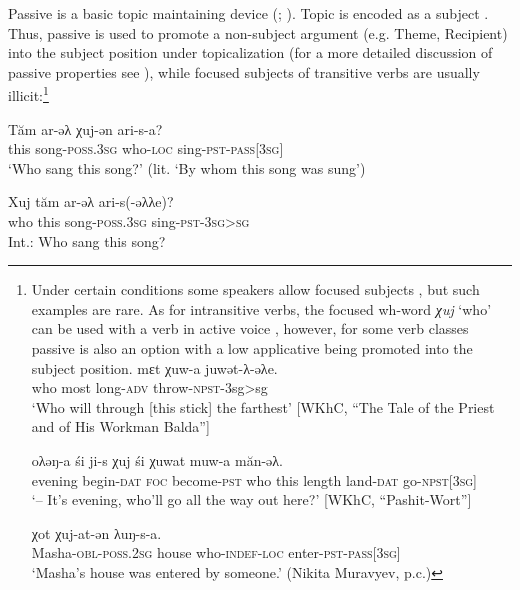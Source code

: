 \documentclass[output=paper]{langscibook}
\begin{document}
Passive is a basic topic maintaining device (\citealt[30]{Nikolaeva1999Ostyak}; \citealt[35]{Koshkaryova2002}). Topic is encoded as a subject \citep{Nikolaeva1995, Nikolaeva1999Ostyak}. Thus, passive is used to promote a non-subject argument (e.g. Theme, Recipient) into the subject position under topicalization (for a more detailed discussion of passive properties see \citealt{Kiss2019, ColleyPrivoznov2019}), while focused subjects of transitive verbs are usually illicit:\footnote{Under certain conditions some speakers allow focused subjects , but such examples are rare. As for intransitive verbs, the focused wh-word \textit{χuj} ‘who’ can be used with a verb in active voice , however, for some verb classes passive is also an option  with a low applicative being promoted into the subject position.
\ea 
	\label{ex:Volkova:fn1}
	 {mɛt} {χuw-a} {juwət-λ-əλe.}\\
	who most long-\textsc{adv} throw-\textsc{npst}-3sg>sg\\
	\glt ‘Who will through [this stick] the farthest’ [WKhC, “The Tale of the Priest and of His Workman Balda”]
\z

\ea
	\label{ex:Volkova:fn2}
	\ea 
	\label{ex:Volkova:fn2a}
	 {oλəŋ-a} {śi} {ji-s} {χuj} {śi} {χuwat} {muw-a} {măn-əλ.}\\
	evening begin-\textsc{dat} \textsc{foc} become-\textsc{pst} who this length land-\textsc{dat} go-\textsc{npst[3sg]}\\
	\glt ‘– It’s evening, who’ll go all the way out here?’ [WKhC, “Pashit-Wort”]
	
	\ex 
	\label{ex:Volkova:fn2b}
	 {χot} {χuj-at-ən} {λuŋ-s-a.}\\
	  Masha-\textsc{obl-poss.2sg} house who-\textsc{indef-loc} enter-\textsc{pst-pass[3sg}]\\
	\glt ‘Masha’s house was entered by someone.’ (Nikita Muravyev, p.c.)
\z
\z

}



\ea 
\label{ex:Volkova:11}
	\ea
	\label{ex:Volkova:11a}
  	 \gll Tăm ar-əλ χuj-ən ari-s-a?\\
  	 this song\textsc{-poss.3sg} who\textsc{-loc} sing\textsc{-pst-pass[3sg]}\\
  	 \glt ‘Who sang this song?’ (lit. ‘By whom this song was sung’)

	\ex
	\label{ex:Volkova:11b}
  	 \gll *Xuj tăm ar-əλ ari-s(-əλλe)?\\
  	 who this song\textsc{{}-poss.3sg} sing\textsc{{}-pst-3sg>sg}\\
  	 \glt Int.: Who sang this song?
	\z
\z
\end{document}
